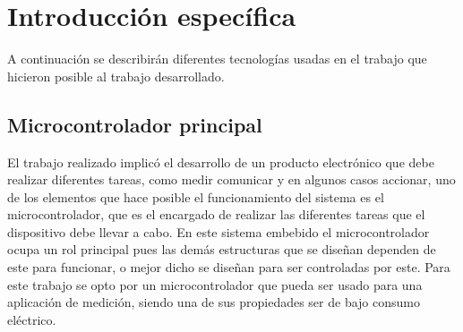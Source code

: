 \chapter{Introducción específica} %

\label{Chapter2}

%
%

A continuación se describirán diferentes tecnologías usadas en el trabajo que hicieron posible al trabajo desarrollado.

\section{Microcontrolador principal}
\label{sec:cap2parte1}

El trabajo realizado implicó el desarrollo de un producto electrónico que debe realizar diferentes tareas, como medir comunicar y en algunos casos accionar, uno de los elementos que hace posible el funcionamiento del sistema es el microcontrolador, que es el encargado de realizar las diferentes tareas que el dispositivo debe llevar a cabo. En este sistema embebido el microcontrolador ocupa un rol principal pues las demás estructuras que se diseñan dependen de este para funcionar, o mejor dicho se diseñan para ser controladas por este. Para este trabajo se opto por un microcontrolador que pueda ser usado para una aplicación de medición, siendo una de sus propiedades ser de bajo consumo eléctrico. 

